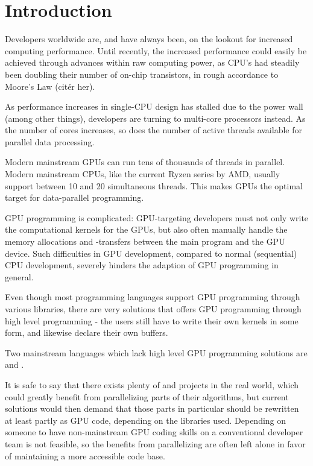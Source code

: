 \chapter{Introduction}
Developers worldwide are, and have always been, on the lookout for increased
computing performance.
Until recently, the increased performance could easily be
achieved through advances within raw computing power, as CPU's had steadily been
doubling their number of on-chip transistors, in rough accordance to Moore's Law (citér
her).

As performance increases in single-CPU design has stalled due to the power
wall\cite{powerwall} (among other things), developers are turning to multi-core
processors instead. As the number of cores increases, so does the number of
active threads available for parallel data processing.

Modern mainstream GPUs can run tens of thousands of threads in
parallel. Modern mainstream CPUs, like the current Ryzen series by AMD, usually
support between 10 and 20 simultaneous threads.
This makes GPUs the optimal target for data-parallel programming.

GPU programming is complicated: GPU-targeting developers must not only
write the computational kernels for the GPUs, but also often manually handle the
memory allocations and -transfers between the main program and the GPU device.
Such difficulties in GPU development, compared to normal (sequential) CPU
development, severely hinders the adaption of GPU programming in general.

Even though most programming languages support GPU programming through various
libraries, there are very solutions that offers GPU programming through high
level programming \-- the users still have to write their own kernels in some
form, and likewise declare their own buffers.

Two mainstream languages which lack high level GPU programming solutions are
\csharp{} and \fsharp{}. 

It is safe to say that there exists plenty of \csharp{} and \fsharp{} projects
in the real world, which could greatly benefit from parallelizing parts of their
algorithms, but current solutions would then demand that those parts in
particular
should be rewritten at least partly as GPU code, depending on the libraries
used. Depending on someone to have non-mainstream GPU coding skills on a
conventional developer team is not feasible, so the benefits from parallelizing
are often left alone in favor of maintaining a more accessible code base.
\clearpage

